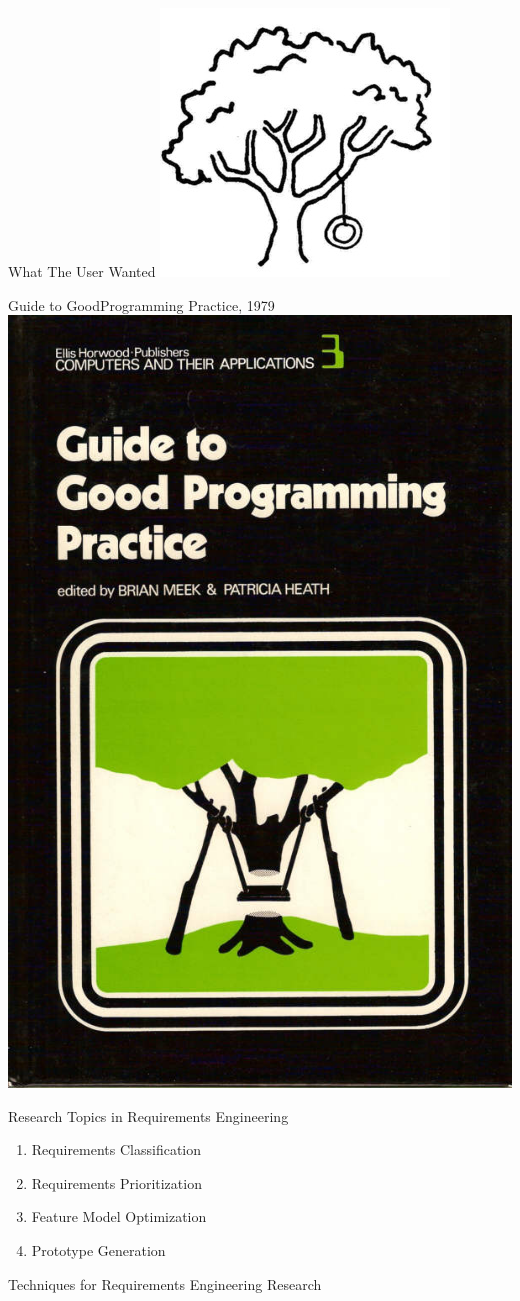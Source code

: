 \documentclass{beamer}
\begin{document}
\begin{frame}[t]{What The User Wanted}
    \includegraphics[width=.4\textwidth]{treecust.jpg}
\end{frame}

\begin{frame}[t]{Guide to GoodProgramming Practice, 1979}
    \includegraphics[width=.4\textwidth]{treeswing_computer_book_cover.jpg}
\end{frame}

\begin{frame}[t]{Research Topics in Requirements Engineering}
    \begin{enumerate}
        \item Requirements Classification
        \item Requirements Prioritization
        \item Feature Model Optimization
        \item Prototype Generation
    \end{enumerate}
\end{frame}

\begin{frame}[t]{Techniques for Requirements Engineering Research}
\end{frame}
\end{document}
